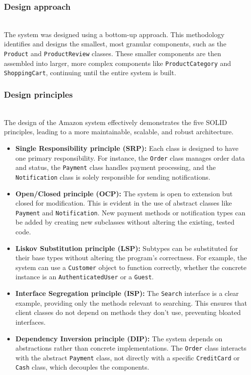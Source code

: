 \subsubsection{Design approach}\label{Wd3W3AOLYIP1Jb4e0RI0P}
\\
The system was designed using a bottom-up approach. This methodology identifies and designs the smallest, most granular components, such as the \texttt{Product} and \texttt{ProductReview} classes. These smaller components are then assembled into larger, more complex components like \texttt{ProductCategory} and \texttt{ShoppingCart}, continuing until the entire system is built.

\subsubsection{Design principles}\label{qek50DnYxoVHRVeUC9Kej}
\\
The design of the Amazon system effectively demonstrates the five SOLID principles, leading to a more maintainable, scalable, and robust architecture.

\begin{itemize}
\item
\protect{}\label{_v8adgq1iJJONOVDHrQOP}
\textbf{Single Responsibility principle (SRP):} Each class is designed to have one primary responsibility. For instance, the \texttt{Order} class manages order data and status, the \texttt{Payment} class handles payment processing, and the \texttt{Notification} class is solely responsible for sending notifications.
\item
\protect{}\label{ct1JxDZyJELPgx6BINLbW}
\textbf{Open/Closed principle (OCP):} The system is open to extension but closed for modification. This is evident in the use of abstract classes like \texttt{Payment} and \texttt{Notification}. New payment methods or notification types can be added by creating new subclasses without altering the existing, tested code.
\item
\protect{}\label{yQzHTYAru29Dmi6em6-Di}
\textbf{Liskov Substitution principle (LSP):} Subtypes can be substituted for their base types without altering the program's correctness. For example, the system can use a \texttt{Customer} object to function correctly, whether the concrete instance is an \texttt{AuthenticatedUser} or a \texttt{Guest}.
\item
\protect{}\label{1CyRDHjIhRe-goNatWuOP}
\textbf{Interface Segregation principle (ISP):} The \texttt{Search} interface is a clear example, providing only the methods relevant to searching. This ensures that client classes do not depend on methods they don't use, preventing bloated interfaces.
\item
\protect{}\label{JY5zBktr2qE-FjwxWFwGv}
\textbf{Dependency Inversion principle (DIP):} The system depends on abstractions rather than concrete implementations. The \texttt{Order} class interacts with the abstract \texttt{Payment} class, not directly with a specific \texttt{CreditCard} or \texttt{Cash} class, which decouples the components.
\end{itemize}

